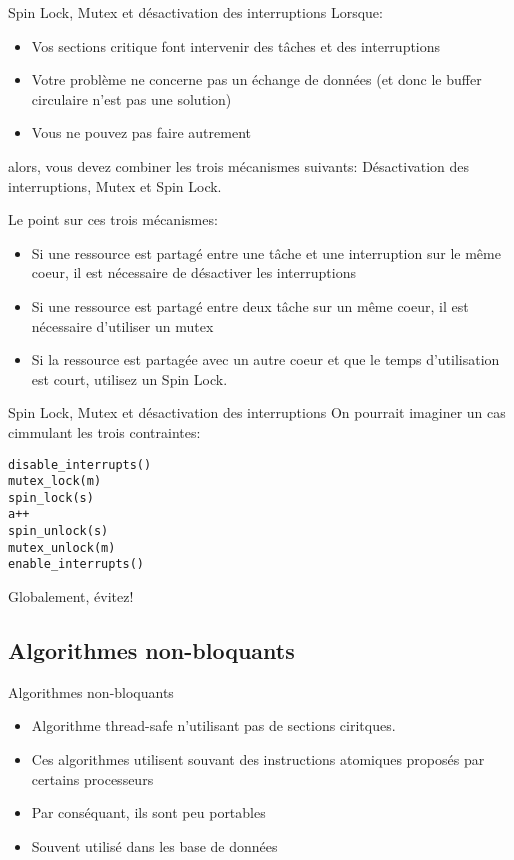 \begin{frame}[fragile]{Spin Lock, Mutex et désactivation des interruptions}
  Lorsque:
  \begin{itemize} 
  \item  Vos  sections critique  font  intervenir  des  tâches et  des
    interruptions
  \item Votre problème ne concerne  pas un échange de données (et donc
    le buffer circulaire n'est pas une solution)
  \item Vous ne pouvez pas faire autrement
  \end{itemize} 
  alors,   vous  devez   combiner  les   trois   mécanismes  suivants:
  Désactivation des interruptions, Mutex et Spin Lock.

  Le point sur ces trois mécanismes:
  \begin{itemize} 
  \item  Si  une  ressource  est   partagé  entre  une  tâche  et  une
    interruption sur  le même coeur,  il est nécessaire  de désactiver
    les interruptions
  \item  Si une ressource  est partagé  entre deux  tâche sur  un même
    coeur, il est nécessaire d'utiliser un mutex
  \item Si  la ressource est  partagée avec un  autre coeur et  que le
    temps d'utilisation est court, utilisez un Spin Lock.
  \end{itemize}
\end{frame}

\begin{frame}[fragile]{Spin Lock, Mutex et désactivation des interruptions}
  On pourrait imaginer un cas cimmulant les trois contraintes:
  \begin{lstlisting} 
disable_interrupts()
mutex_lock(m)
spin_lock(s)
a++
spin_unlock(s)
mutex_unlock(m)
enable_interrupts()
  \end{lstlisting} 
  Globalement, évitez!
\end{frame} 

\subsection{Algorithmes non-bloquants}

\begin{frame}{Algorithmes non-bloquants}
  \begin{itemize} 
  \item Algorithme thread-safe n'utilisant pas de sections ciritques. 
  \item Ces  algorithmes utilisent souvant  des instructions atomiques
    proposés par certains processeurs
  \item Par conséquant, ils sont peu portables
  \item Souvent utilisé dans les base de données
  \end{itemize} 
\end{frame} 

